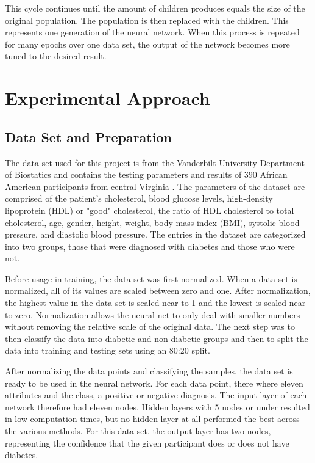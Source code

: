 \documentclass[12pt]{article}
\begin{document}
        This cycle continues until the amount of children produces equals the size of the original population.  The population
        is then replaced with the children.  This represents one generation of the neural network.
        When this process is repeated for many epochs over one data set, the output of the network becomes more
        tuned to the desired result.
\section{Experimental Approach}
    \subsection{Data Set and Preparation}
        The data set used for this project is from the Vanderbilt University Department of Biostatics and contains
        the testing parameters and results of 390 African American participants from central Virginia \cite{diabetesData}.
        The parameters of the dataset are comprised of the patient's cholesterol, blood glucose levels, high-density lipoprotein (HDL)
        or "good" cholesterol, the ratio of HDL cholesterol to total cholesterol, age, gender, height, weight, body mass index (BMI),
        systolic blood pressure, and diastolic blood pressure.  The entries in the dataset are categorized into two groups, those that
        were diagnosed with diabetes and those who were not.

        Before usage in training, the data set was first normalized.  When a data set is normalized, all of its values are scaled
        between zero and one.  After normalization, the highest value in the data set is scaled near to 1 and the lowest is scaled near to zero.
        Normalization allows the neural net to only deal with smaller numbers without removing the relative scale of the original data.
        The next step was to then classify the data into diabetic and non-diabetic groups and then to split the data into training and
        testing sets using an 80:20 split.

        After normalizing the data points and classifying the samples, the data set is ready to be used in the neural network.
        For each data point, there where eleven attributes and the class, a positive or negative diagnosis.
        The input layer of each network therefore had eleven nodes.
        Hidden layers with 5 nodes or under resulted in low computation times, but no hidden layer at all performed the best across the various methods.
        For this data set, the output layer has two nodes, representing the confidence that the given participant does or does not have diabetes.
\end{document}
